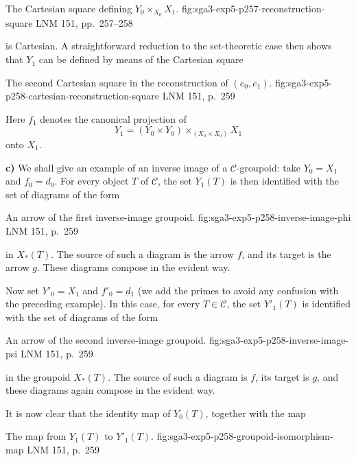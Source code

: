   {The Cartesian square defining \(Y_0\times_{X_0}X_1\).}
  {fig:sga3-exp5-p257-reconstruction-square}
  {LNM 151, pp.~257--258}

\noindent is Cartesian. A straightforward reduction to the set-theoretic
case then shows that \(Y_1\) can be defined by means of the Cartesian
square

  {The second Cartesian square in the reconstruction of \((e_0,e_1)\).}
  {fig:sga3-exp5-p258-cartesian-reconstruction-square}
  {LNM 151, p.~259}

Here \(f_1\) denotes the canonical projection of
\[
  Y_1=(Y_0\times Y_0)\times_{(X_0\times X_0)}X_1
\]
onto \(X_1\).

\medskip
{}\label{par:sga3-V-3-c}%
\noindent\textbf{c)} We shall give an example of an inverse image of a
\(\mathscr C\)-groupoid: take \(Y_0=X_1\) and \(f_0=d_0\). For every
object \(T\) of \(\mathscr C\), the set \(Y_1(T)\) is then identified
with the set of diagrams of the form

  {An arrow of the first inverse-image groupoid.}
  {fig:sga3-exp5-p258-inverse-image-phi}
  {LNM 151, p.~259}

\noindent in \(X_\ast(T)\). The source of such a diagram is the arrow
\(f\), and its target is the arrow \(g\). These diagrams compose in the
evident way.

Now set \(Y'_0=X_1\) and \(f'_0=d_1\) (we add the primes
to avoid any confusion with the preceding example). In this case, for
every \(T\in\mathscr C\), the set \(Y'_1(T)\) is identified with the set
of diagrams of the form

  {An arrow of the second inverse-image groupoid.}
  {fig:sga3-exp5-p258-inverse-image-psi}
  {LNM 151, p.~259}

\noindent in the groupoid \(X_\ast(T)\). The source of such a diagram is
\(f\), its target is \(g\), and these diagrams again compose in the
evident way.

It is now clear that the identity map of \(Y_0(T)\), together with the
map

  {The map from \(Y_1(T)\) to \(Y'_1(T)\).}
  {fig:sga3-exp5-p258-groupoid-isomorphism-map}
  {LNM 151, p.~259}

